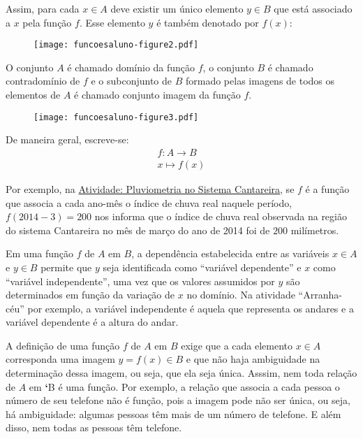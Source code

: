 \documentclass[extrafontsizes, twoside, 11pt, openright, final]{memoir}
\begin{document}
Assim, para cada $x\in A$ deve existir um único elemento $y\in B$ que está associado a $x$ pela função $f$. Esse elemento $y$ é também denotado por $f(x)$:

\begin{figure}[H]
	\begin{center}
		\texttt{[image: funcoesaluno-figure2.pdf]}
	\end{center}
\end{figure}

O conjunto $A$ é chamado domínio da função $f$, o conjunto $B$ é chamado contradomínio de $f$ e o subconjunto de $B$ formado pelas imagens de todos os elementos de $A$ é chamado conjunto imagem da função $f$.

\begin{figure}[H]
	\begin{center}
		\texttt{[image: funcoesaluno-figure3.pdf]}
	\end{center}
\end{figure}
De maneira geral, escreve-se:
\begin{equation*}
	\begin{split}f:A \to B \\
		x \mapsto f(x)\end{split}
\end{equation*}

Por exemplo, na {\hyperref[\detokenize{AF106-0:ativ-funcoes-pluviometria}]{Atividade: Pluviometria no Sistema Cantareira}}, se $f$ é a função que associa a cada ano-mês o índice de chuva real naquele período, $f(2014-3)=200$ nos informa que o índice de chuva real observada na região do sistema Cantareira no mês de março do ano de 2014 foi de $200$ milímetros.

Em uma função $f$ de $A$ em $B$, a dependência estabelecida entre as variáveis $x \in A$ e $y \in B$ permite que $y$ seja identificada como “variável dependente” e $x$ como  “variável independente”, uma vez que os valores assumidos por $y$ são determinados em função da variação de $x$ no domínio. Na atividade “Arranha-céu” por exemplo, a variável independente é aquela que representa os andares e a variável dependente é a altura do andar.

\begin{observation}
	A definição de uma função $f$ de $A$ em $B$ exige que a cada elemento $x\in A$ corresponda uma imagem $y=f(x)\in B$ e que não haja ambiguidade na determinação dessa imagem, ou seja, que ela seja única. Asssim, nem toda relação de $A$ em {\color{red}\bfseries{}{}`}B é uma função. Por exemplo, a relação que associa a cada pessoa o número de seu telefone não é função, pois a imagem pode não ser única, ou seja, há ambiguidade: algumas pessoas têm mais de um número de telefone. E além disso, nem todas as pessoas têm telefone.
\end{observation}
\end{document}
